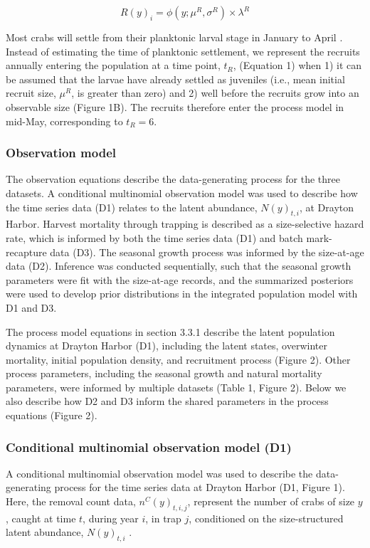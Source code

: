 \documentclass{article}
\begin{document}
\begin{equation}
R(y)_{i} = \phi(y; \mu^R, \sigma^R) \times \lambda^R
\end{equation}

Most crabs will settle from their planktonic larval stage in January to April \parencite{yamada2005growth}. Instead of estimating the time of planktonic settlement, we represent the recruits annually entering the population at a time point, $t_R$, (Equation 1) when 1) it can be assumed that the larvae have already settled as juveniles (i.e., mean initial recruit size, $\mu^R$, is greater than zero) and 2) well before the recruits grow into an observable size (Figure 1B). The recruits therefore enter the process model in mid-May, corresponding to $t_R=6$. 

\subsubsection{Observation model}

The observation equations describe the data-generating process for the three datasets. A conditional multinomial observation model was used to describe how the time series data (D1) relates to the latent abundance, $N(y)_{t,i}$, at Drayton Harbor. Harvest mortality through trapping is described as a size-selective hazard rate, which is informed by both the time series data (D1) and batch mark-recapture data (D3). The seasonal growth process was informed by the size-at-age data (D2). Inference was conducted sequentially, such that the seasonal growth parameters were fit with the size-at-age records, and the summarized posteriors were used to develop prior distributions in the integrated population model with D1 and D3.

The process model equations in section 3.3.1 describe the latent population dynamics at Drayton Harbor (D1), including the latent states, overwinter mortality, initial population density, and recruitment process (Figure 2). Other process parameters, including the seasonal growth and natural mortality parameters, were informed by multiple datasets (Table 1, Figure 2). Below we also describe how D2 and D3 inform the shared parameters in the process equations (Figure 2).

\subsubsection*{Conditional multinomial observation model (D1)}

A conditional multinomial observation model was used to describe the data-generating process for the time series data at Drayton Harbor (D1, Figure 1). Here, the removal count data, $n^C(y)_{t,i,j}$, represent the number of crabs of size $y$, caught at time $t$, during year $i$, in trap $j$, conditioned on the size-structured latent abundance, $N(y)_{t,i}$ \parencite{kery2015modeling}. 
\end{document}
